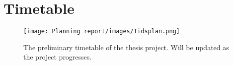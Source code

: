 
\section{Timetable}
\begin{comment}
\textcolor{red}{
Den här delen av planeringsrapporten beskriver vad som ska göras och när det ska göras. Personer som ska kontaktas bör också stå med här. Datum eller åtminstone veckor då studenterna ska ge delrapporter samt slutgiltiga presentationen ska stå här. Tidsplanen kommer naturligtvis vara rätt grov i början.
\\\\
Det är viktigt att notera att aktiviteterna inom projektet inte kan ske sekventiellt då dessa aktiviteter är beroende av varandra, vilket innebär att ett antal iterationer mellan dem kommer att ske. Endast genom att iterera mellan dem kommer den uppbyggda kunskapen bli utnyttjad på ett bra sätt. Samma tänkande gäller också rapportskrivandet, det vill säga uppdatering av ett avsnitt kräver att även andra uppdateras. Rapportskrivande ska därför ske kontinuerligt under hela projektet.
}
\end{comment}



\begin{figure}[H]
    \centering
    \texttt{[image: Planning report/images/Tidsplan.png]}
    \caption{The preliminary timetable of the thesis project. Will be updated as the project progresses.}
    \label{fig:timetable}
\end{figure}